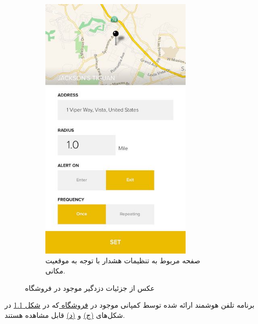 \documentclass[a4paper,12pt]{report}
\begin{document}
\begin{figure}[!h]
\begin{subfigure}[t]{0.3\linewidth}
			\includegraphics[width=0.8\textwidth]{images/viper_smart_start_2.jpg}
			\caption{
				صفحه مربوط به تنظیمات هشدار با توجه به موقعیت مکانی.
			}
			\label{subfig4:fig1:sec3:chap1}
		\end{subfigure}
		\normalsize
		\caption{
			عکس از جزئیات دزدگیر
			موجود در فروشگاه
			\hyperref{https://www.amazon.com/Viper-5906V-Color-Remote-Security/dp/B00H0874IG}{car alarm unboxed}{Viper 5906V}{}
		}
		\label{fig1:sec3:chap1}
	\end{figure}

	برنامه تلفن هوشمند ارائه شده توسط کمپانی
	موجود در
	\hyperref{https://play.google.com/store/apps/details?id=com.directed.android.viper}{car alarm application}{Viper 5906V}{فروشگاه }
	که در
	\hyperref[fig1:sec3:chap1]{شکل 1.1}
	 در شکل‌های
	\hyperref[subfig3:fig1:sec3:chap1]{(ج)}
	و
	\hyperref[subfig3:fig1:sec3:chap1]{(د)}
	قابل مشاهده هستند.
\end{document}
